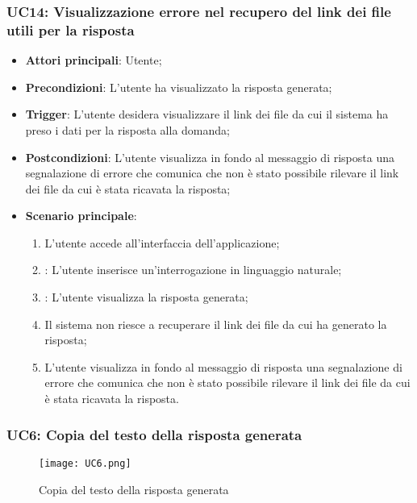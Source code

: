 \subsubsection{UC14: Visualizzazione errore nel recupero del link dei file utili per la risposta}
\begin{itemize}
    \item \textbf{Attori principali}: Utente;
    \item \textbf{Precondizioni}: L'utente ha visualizzato la risposta generata;
    \item \textbf{Trigger}: L'utente desidera visualizzare il link dei file da cui il sistema ha preso i dati per la risposta alla domanda;
    \item \textbf{Postcondizioni}: L'utente visualizza in fondo al messaggio di risposta una segnalazione di errore che comunica che non è
    stato possibile rilevare il link dei file da cui è stata ricavata la risposta;
    \item \textbf{Scenario principale}: 
    \begin{enumerate}
        \item L'utente accede all'interfaccia dell'applicazione;
        \item {}: L'utente inserisce un'interrogazione in linguaggio naturale;
        \item {}: L'utente visualizza la risposta generata;
        \item Il sistema non riesce a recuperare il link dei file da cui ha generato la risposta;
        \item L'utente visualizza in fondo al messaggio di risposta una segnalazione di errore che comunica che non è stato possibile
        rilevare il link dei file da cui è stata ricavata la risposta.
    \end{enumerate}
\end{itemize}

\newpage

\hypertarget{UC6}{}
\subsubsection{UC6: Copia del testo della risposta generata}

\begin{figure}[h]
    \centering
    \texttt{[image: UC6.png]}
    \caption{Copia del testo della risposta generata}
\end{figure}

